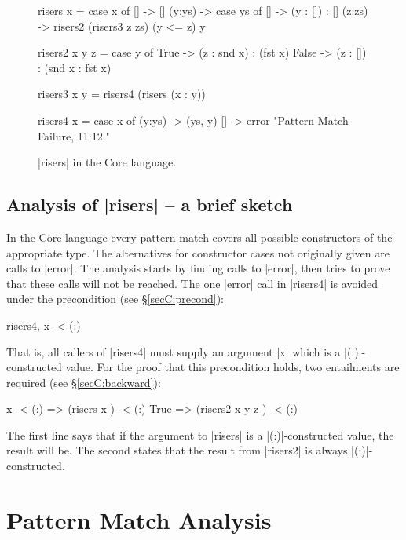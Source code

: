 \begin{figure}
\begin{code}
risers x = case x of
    [] -> []
    (y:ys) ->  case ys of
         [] -> (y : []) : []
         (z:zs) -> risers2 (risers3 z zs) (y <= z) y

risers2 x y z =  case y of
    True -> (z : snd x) : (fst x)
    False -> (z : []) : (snd x : fst x)

risers3 x y = risers4 (risers (x : y))

risers4 x = case x of
    (y:ys) -> (ys, y)
    [] -> error "Pattern Match Failure, 11:12."
\end{code}
\caption{|risers| in the Core language.}
\label{figC:risers_core}
\end{figure}

\subsection{Analysis of |risers| -- a brief sketch}

In the Core language every pattern match covers all possible constructors of the appropriate type. The alternatives for constructor cases not originally given are calls to |error|. The analysis starts by finding calls to |error|, then tries to prove that these calls will not be reached. The one |error| call in |risers4| is avoided under the precondition (see \S\ref{secC:precond}):

\ignore\begin{code}
risers4, x -< (:)
\end{code}

\noindent That is, all callers of |risers4| must supply an argument |x| which is a |(:)|-constructed value. For the proof that this precondition holds, two entailments are required (see \S\ref{secC:backward}):

\ignore\begin{code}
x -< (:)  => (risers x       ) -< (:)
True      => (risers2 x y z  ) -< (:)
\end{code}

\noindent The first line says that if the argument to |risers| is a |(:)|-constructed value, the result will be. The second states that the result from |risers2| is always |(:)|-constructed.



\section{Pattern Match Analysis}
\label{secC:manipulate}


